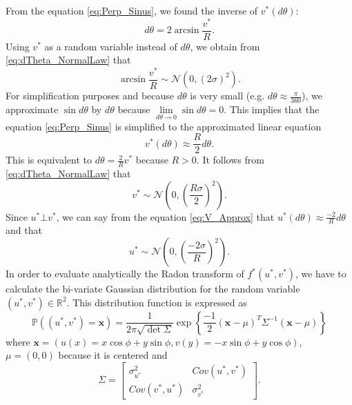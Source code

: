 \documentclass{article}
\begin{document}
From the equation \eqref{eq:Perp_Sinus}, we found the inverse of $v^*(d\theta)$:
\begin{equation*}
    d\theta = 2 \arcsin{\frac{v^*}{R}}.
\end{equation*}
Using $v^*$ as a random variable instead of $d\theta$, we obtain from \eqref{eq:dTheta_NormalLaw} that
\begin{equation*}
    \arcsin{\frac{v^*}{R}} \sim \mathcal{N}(0, (2\sigma)^2).
\end{equation*}
For simplification purposes and because $d\theta$ is very small (e.g. $d\theta \approx \frac{\pi}{360}$), we approximate $\sin{d\theta}$ by $d\theta$ because $\lim\limits_{d\theta \rightarrow 0} \sin{d\theta} = 0$. This implies that the equation \eqref{eq:Perp_Sinus} is simplified to the approximated linear equation 
\begin{equation} \label{eq:V_Approx}
    v^*(d\theta) \approx \frac{R}{2} d\theta.
\end{equation}
This is equivalent to $d\theta = \frac{2}{R}v^*$ because $R > 0$. It follows from \eqref{eq:dTheta_NormalLaw} that
\begin{equation*}
    v^* \sim \mathcal{N}\left(0, \left(\frac{R \sigma}{2}\right)^2\right).
\end{equation*}
Since $u^* \bot v^*$, we can say from the equation \eqref{eq:V_Approx} that $u^*(d\theta) \approx \frac{-2}{R} d\theta$ and that 
\begin{equation*}
    u^* \sim \mathcal{N}\left(0, \left(\frac{-2\sigma}{R}\right)^2\right).
\end{equation*}
In order to evaluate analytically the Radon transform of $f^*(u^*, v^*)$, we have to calculate the bi-variate Gaussian distribution for the random variable $(u^*, v^*) \in \mathbb{R}^2$. This distribution function is expressed as
\begin{equation} \label{eq:Multivariate_Gaussian}
    \mathbb{P}((u^*, v^*) = \mathbf{x}) = \frac{1}{2\pi \sqrt{\det \Sigma}} \exp\left\{\frac{-1}{2} (\mathbf{x} - \mu)^T \Sigma^{-1} (\mathbf{x} - \mu)\right\}
\end{equation}
where $\mathbf{x} = (u(x) = x\cos{\phi} + y\sin{\phi}, v(y) = -x\sin{\phi} + y\cos{\phi})$, $\mu = (0, 0)$ because it is centered and
\begin{equation} \label{eq:2D_Variance_Matrix}
    \Sigma = 
    \begin{bmatrix}
  		\sigma^2_{u^*} & Cov(u^*, v^*) \\
  		Cov(v^*, u^*) & \sigma^2_{v^*}
	\end{bmatrix}.
\end{equation}
\end{document}
